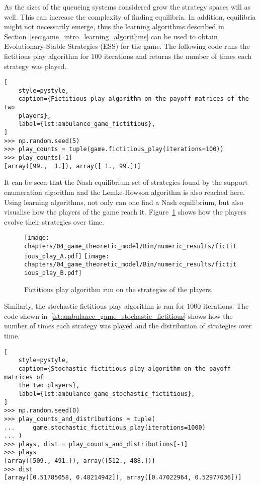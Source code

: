 As the sizes of the queueing systems considered grow the strategy spaces will
as well.
This can increase the complexity of finding equilibria.
In addition, equilibria might not necessarily emerge, thus the learning
algorithms described in Section~\ref{sec:game_intro_learning_algorithms} can be
used to obtain Evolutionary Stable Strategies (ESS) for the game.
The following code runs the fictitious play algorithm for \(100\) iterations
and returns the number of times each strategy was played.

\begin{lstlisting}[
    style=pystyle,
    caption={Fictitious play algorithm on the payoff matrices of the two
    players},
    label={lst:ambulance_game_fictitious},
]
>>> np.random.seed(5)
>>> play_counts = tuple(game.fictitious_play(iterations=100))
>>> play_counts[-1]
[array([99.,  1.]), array([ 1., 99.])]

\end{lstlisting}

It can be seen that the Nash equilibrium set of strategies found by the
support enumeration algorithm and the Lemke-Howson algorithm is also reached
here.
Using learning algorithms, not only can one find a Nash equilibrium,
but also visualise how the players of the game reach it.
Figure~\ref{fig:solving_game_fictitious_example} shows how the players evolve
their strategies over time.

\begin{figure}[H]
    \centering
    \texttt{[image: chapters/04\_game\_theoretic\_model/Bin/numeric\_results/fictitious\_play\_A.pdf]}
    \texttt{[image: chapters/04\_game\_theoretic\_model/Bin/numeric\_results/fictitious\_play\_B.pdf]}
    \caption{Fictitious play algorithm run on the strategies of the players.}
    \label{fig:solving_game_fictitious_example}
\end{figure}

Similarly, the stochastic fictitious play algorithm is ran for \(1000\)
iterations.
The code shown in~\ref{lst:ambulance_game_stochastic_fictitious} shows how the
number of times each strategy was played and
the distribution of strategies over time.

\vspace{0.5cm}

\begin{lstlisting}[
    style=pystyle,
    caption={Stochastic fictitious play algorithm on the payoff matrices of
    the two players},
    label={lst:ambulance_game_stochastic_fictitious},
]
>>> np.random.seed(0)
>>> play_counts_and_distributions = tuple(
...     game.stochastic_fictitious_play(iterations=1000)
... )
>>> plays, dist = play_counts_and_distributions[-1]
>>> plays
[array([509., 491.]), array([512., 488.])]
>>> dist
[array([0.51785058, 0.48214942]), array([0.47022964, 0.52977036])]

\end{lstlisting}

